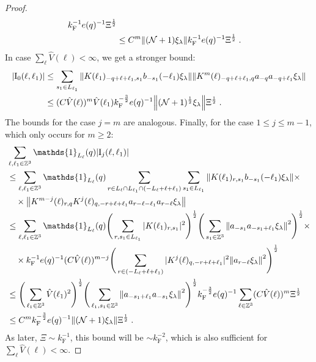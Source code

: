 \documentclass[12pt,a4paper]{article}
\numberwithin{equation}{section}
\newcommand{\1}{\mathbb{I}}
\newcommand{\F}{\mathrm{F}}
\newcommand{\I}{\mathrm{I}}
\newcommand{\Zstar}{\mathbb{Z}^3} %
\newcommand{\Z}{\mathbb{Z}}
\newcommand{\NN}{\mathcal{N}}
\newcommand{\half}{\frac{1}{2}}
\theoremstyle{plain}
\theoremstyle{definition}
\theoremstyle{remark}
\theoremstyle{plain}
\theoremstyle{definition}
\theoremstyle{remark}
\begin{document}
\begin{proof}
\begin{align}
		k_{\F}^{-1} e(q)^{-1} \Xi^\half \nonumber\\
	&\leq C^m \norm{(\NN+1) \xi_\lambda}
		k_{\F}^{-1} e(q)^{-1} \Xi^\half \;. \label{eq:estEQ2171_Coulomb}
\end{align}
In case $ \sum_\ell \hat{V}(\ell) < \infty $, we get a stronger bound:
\begin{align}
	|\I_0(\ell, \ell_1)|
	&\leq \sum_{s_1 \in L_{\ell_1}}
		\norm{K(\ell_1)_{-q+\ell+\ell_1,s_1} b_{-s_1}(-\ell_1) \xi_\lambda}
		\norm{ K^m(\ell)_{-q+\ell+\ell_1,q}a_{-q}a_{-q+\ell_1} \xi_\lambda } \nonumber\\
	&\leq (C \hat{V}(\ell))^m
		\hat{V}(\ell_1)
		k_{\F}^{-\frac 32} e(q)^{-1}
		\norm{(\NN+1)^\half\xi_\lambda} \Xi^\half \;. \label{eq:estEQ2171}
\end{align}
The bounds for the case $ j = m $ are analogous. Finally, for the case $ 1 \le j \le m-1 $, which only occurs for $ m \ge 2 $:
\begin{align}
	&\sum_{\ell,\ell_1 \in \Zstar} \mathds{1}_{L_\ell}(q) |\I_j(\ell, \ell_1)| \nonumber\\
	&\leq \sum_{\ell,\ell_1 \in \Zstar} \mathds{1}_{L_\ell}(q) \sum\limits_{r\in L_{\ell} \cap L_{\ell_1} \cap (-L_{\ell}+\ell+\ell_1)}
		\sum\limits_{s_1\in L_{\ell_1}} 
		\norm{K(\ell_1)_{r,s_1} b_{-s_1}(-\ell_1) \xi_\lambda} \times \nonumber\\
	&\quad \times \norm{ K^{m-j}(\ell)_{r,q} K^j(\ell)_{q,-r+\ell+\ell_1} a_{r-\ell-\ell_1} a_{r-\ell} \xi_\lambda } \nonumber\\
	&\leq \sum_{\ell,\ell_1 \in \Zstar} \mathds{1}_{L_\ell}(q) \Bigg( \sum\limits_{r,s_1\in L_{\ell_1}} 
		|K(\ell_1)_{r,s_1}|^2 \Bigg)^{\half}
		\Bigg( \sum\limits_{s_1 \in \Z^3}
		\norm{a_{-s_1} a_{-s_1+\ell_1} \xi_\lambda}^2 \Bigg)^{\half} \times \nonumber\\
		&\quad \times k_{\F}^{-1} e(q)^{-1} (C \hat{V}(\ell))^{m-j}
		\Bigg( \sum\limits_{r\in (-L_{\ell}+\ell+\ell_1)} 
		|K^j(\ell)_{q,-r+\ell+\ell_1}|^2
		\norm{ a_{r-\ell} \xi_\lambda }^2 \Bigg)^{\half} \nonumber\\
	&\leq  \Bigg( \sum_{\ell_1 \in \Zstar} 
		\hat{V}(\ell_1)^2 \Bigg)^{\half}
		\Bigg( \sum\limits_{\ell_1,s_1 \in \Z^3}
		\norm{a_{-s_1+\ell_1} a_{-s_1} \xi_\lambda}^2 \Bigg)^{\half}
		k_{\F}^{-\frac 32} e(q)^{-1} \sum_{\ell \in \Zstar} (C \hat{V}(\ell))^m \Xi^\half \nonumber\\
	&\leq C^m k_{\F}^{-\frac 32} e(q)^{-1}
		\norm{(\NN+1) \xi_\lambda} \Xi^{\half} \;. \label{eq:estEQ2172}
\end{align}
As later, $ \Xi \sim k_{\F}^{-1} $, this bound will be $ \sim k_{\F}^{-2} $, which is also sufficient for $ \sum_\ell \hat{V}(\ell) < \infty $.
\end{proof}
\end{document}
